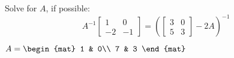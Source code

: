 
\begin{Exercise}[
name={},
title={}, 
difficulty=0,
origin={\cite{BS}}]
Solve for $A$, if possible:
\[
A^{-1}\begin{bmatrix}
1 & 0\\
-2 & -1
\end{bmatrix}
=
\left(
\begin{bmatrix}
3 & 0\\
5 & 3
\end{bmatrix}
-2A
\right)^{-1}
\]
\end{Exercise}

\begin{Answer}
$
A=\begin{mat}
1 & 0\\
7 & 3
\end{mat}
$
\end{Answer}
